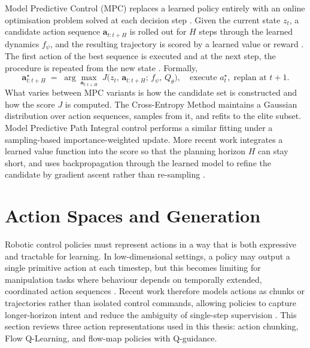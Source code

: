 Model Predictive Control (MPC) replaces a learned policy entirely with an online optimisation problem solved at each decision step \cite{rawlings2017model, Camacho:1999}. Given the current state $z_t$, a candidate action sequence $\mathbf{a}_{t:t+H}$ is rolled out for $H$ steps through the learned dynamics $f_\psi$, and the resulting trajectory is scored by a learned value or reward \cite{chua2018deepreinforcementlearninghandful, hafner2019planet}. The first action of the best sequence is executed and at the next step, the procedure is repeated from the new state \cite{rawlings2017model}. Formally,
\begin{equation}
    \mathbf{a}^{\star}_{t:t+H} \;=\; \arg\max_{\mathbf{a}_{t:t+H}} \; J\!\big(z_t,\, \mathbf{a}_{t:t+H};\, f_\psi,\, Q_\theta\big),
    \quad \text{execute } a^{\star}_t,\; \text{replan at } t+1.
    \label{eq:mpc-objective-bg}
\end{equation}
What varies between MPC variants is how the candidate set is constructed and how the score $J$ is computed. The Cross-Entropy Method \cite{Rubinstein1999} maintains a Gaussian distribution over action sequences, samples from it, and refits to the elite subset. Model Predictive Path Integral control \cite{williams2015modelpredictivepathintegral} performs a similar fitting under a sampling-based importance-weighted update. More recent work integrates a learned value function into the score so that the planning horizon $H$ can stay short, and uses backpropagation through the learned model to refine the candidate by gradient ascent rather than re-sampling \cite{hansen2022temporaldifferencelearningmodel}.

\section{Action Spaces and Generation}
\label{sec:action-spaces-bg}

Robotic control policies must represent actions in a way that is both expressive and tractable for learning. In low-dimensional settings, a policy may output a single primitive action at each timestep, but this becomes limiting for manipulation tasks where behaviour depends on temporally extended, coordinated action sequences \cite{zhao2023learningfinegrainedbimanualmanipulation,chi2024diffusionpolicyvisuomotorpolicy}. Recent work therefore models actions as chunks or trajectories rather than isolated control commands, allowing policies to capture longer-horizon intent and reduce the ambiguity of single-step supervision \cite{li2026reinforcementlearningactionchunking}. This section reviews three action representations used in this thesis: action chunking, Flow Q-Learning, and flow-map policies with Q-guidance.

